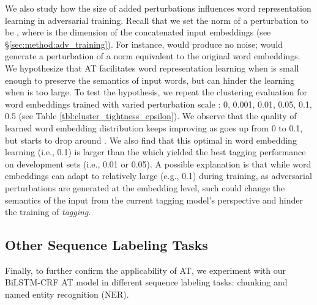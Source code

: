 \documentclass[11pt,a4paper]{article}
\begin{document}
We also study how the size of added perturbations influences word representation learning in adversarial training.
Recall that we set the norm of a perturbation  to be , where  is the dimension of the concatenated input embeddings (see \S \ref{sec:method:adv_training}).
For instance,  
would produce no noise;  would generate a perturbation of a norm equivalent to the original word embeddings.
We hypothesize that AT facilitates word representation learning when  is small enough to preserve the semantics of input words, but can hinder the learning when  is too large.
To test the hypothesis, we repeat the clustering evaluation for 
word embeddings trained with varied perturbation scale : 0, 0.001, 0.01, 0.05, 0.1, 0.5 (see Table \ref{tbl:cluster_tightness_epsilon}).
We observe that the quality of 
learned word embedding distribution keeps improving as  goes up from 0 to 0.1, but starts to drop around .
We also find that this optimal  in word embedding learning (i.e., 0.1)
is larger than the  which yielded the best tagging performance on development sets (i.e., 0.01 or 0.05).
A possible explanation is that
while word embeddings
can adapt to relatively large  (e.g., 0.1) during training, as adversarial perturbations are generated at the embedding level, such  could change the semantics of the input from the current tagging model's perspective and hinder the training of {\it tagging}.





\subsection{Other Sequence Labeling Tasks}
\label{sec:additional_task}

Finally, to further confirm the applicability of AT, we experiment with our BiLSTM-CRF AT model in different sequence labeling tasks: chunking and named entity recognition (NER).\vspace{0.5mm}
\end{document}
